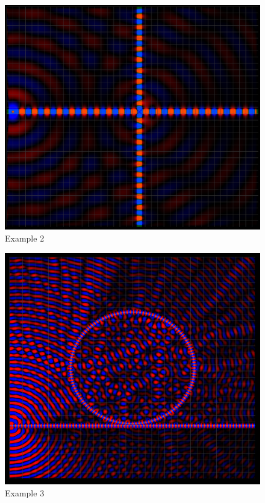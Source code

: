 \begin{figure}[H]
	\centering
	\includegraphics[width=\textwidth,
	keepaspectratio]{example2.png}
	\caption{Example 2}
	\label{fig:example2}
\end{figure}


\begin{figure}[H]
	\centering
	\includegraphics[width=\textwidth,
	keepaspectratio]{example3.png}
	\caption{Example 3}
	\label{fig:example3}
\end{figure}



